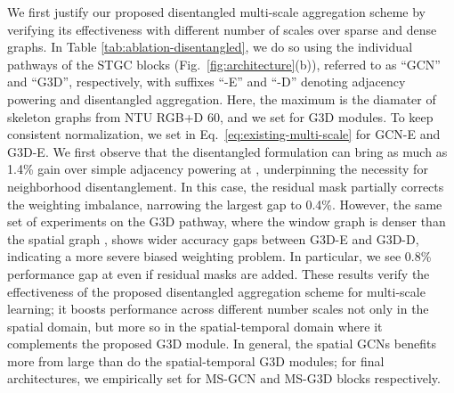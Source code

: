 \documentclass[10pt,twocolumn,letterpaper]{article}
\makeatletter
\renewcommand{\paragraph}{\@startsection{paragraph}{4}{\z@}{1.5ex \@plus 1ex \@minus .2ex}{-1em}{\normalfont\normalsize\bfseries}}
\makeatother
\begin{document}
We first justify our proposed disentangled multi-scale aggregation scheme by verifying its effectiveness with different number of scales over sparse and dense graphs. In Table \ref{tab:ablation-disentangled}, we do so using the individual pathways of the STGC blocks (Fig.~\ref{fig:architecture}(b)), referred to as ``GCN'' and ``G3D'', respectively, with suffixes ``-E'' and ``-D'' denoting adjacency powering and disentangled aggregation.
Here, the maximum  is the diamater of skeleton graphs from NTU RGB+D 60, and we set  for G3D modules.
To keep consistent normalization, we set  in Eq.~\ref{eq:existing-multi-scale} for GCN-E and G3D-E.
We first observe that the disentangled formulation can bring as much as 1.4\% gain over simple adjacency powering at , underpinning the necessity for neighborhood disentanglement.
In this case, the residual mask  partially corrects the weighting imbalance, narrowing the largest gap to 0.4\%.
However, the same set of experiments on the G3D pathway, where the window graph  is denser than the spatial graph , shows wider accuracy gaps between G3D-E and G3D-D, indicating a more severe biased weighting problem. In particular, we see 0.8\% performance gap at  even if residual masks are added.
These results verify the effectiveness of the proposed disentangled aggregation scheme for multi-scale learning; it boosts performance across different number scales not only in the spatial domain, but more so in the spatial-temporal domain where it complements the proposed G3D module.
In general, the spatial GCNs benefits more from large  than do the spatial-temporal G3D modules; for final architectures, we empirically set  for MS-GCN and MS-G3D blocks respectively.




\paragraph{Effectiveness of G3D.}
\end{document}
